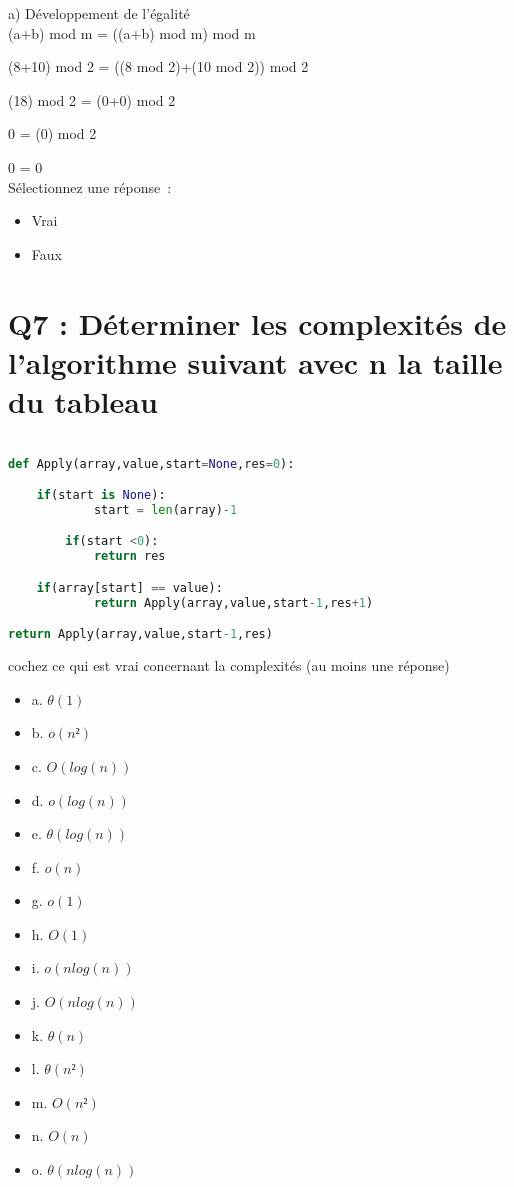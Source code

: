 a) Développement de l'égalité \\

(a+b) mod m = ((a+b) mod m) mod m

(8+10) mod 2 = ((8 mod 2)+(10 mod 2)) mod 2

(18) mod 2 = (0+0) mod 2

0 = (0) mod 2

0 = 0 \\

Sélectionnez une réponse :
\begin{itemize}[label=$\square$]
\item Vrai
\item Faux
\end{itemize}


\newpage
\section{Q7 : Déterminer les complexités de l’algorithme suivant avec n la taille du tableau}

\vspace{5mm} %

\begin{lstlisting}[language=Python, caption=Python algorithme]

def Apply(array,value,start=None,res=0):

	if(start is None):
            start = len(array)-1

        if(start <0):
            return res

	if(array[start] == value):
            return Apply(array,value,start-1,res+1)

return Apply(array,value,start-1,res)
\end{lstlisting}

\vspace{5mm} %

cochez ce qui est vrai concernant la complexités (au moins une réponse)\\
\begin{itemize}[label=$\square$]
\item {a. $\theta(1)$}
\item {b. $o(n²)$}
\item {c. $O(log(n))$}
\item {d. $o(log(n))$}
\item {e. $\theta(log(n))$}
\item {f. $o(n)$}
\item {g. $o(1)$}
\item {h. $O(1)$}
\item {i. $o(n log(n))$}
\item {j. $O(n log(n))$}
\item {k. $\theta(n)$}
\item {l. $\theta(n²)$}
\item {m. $O(n²)$}
\item {n. $O(n)$}
\item {o. $\theta(n log(n))$}
\end{itemize}

